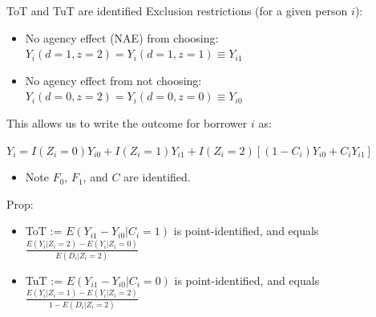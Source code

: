 \documentclass[9pt, aspectratio=169]{beamer}
\begin{document}
\begin{frame}{ToT and TuT are identified}
Exclusion restrictions (for a given person $i$):
\begin{itemize}
        \item No agency effect 
        (NAE) from choosing: $Y_i(d=1,z=2)=Y_i(d=1,z=1) \equiv Y_{i1}$
        \item  No agency effect from not choosing: $Y_i(d=0,z=2)=Y_i(d=0,z=0) \equiv Y_{i0}$
    \end{itemize}
\pause \vfill This allows us to write the outcome for borrower $i$ as:
\begin{center}
    $Y_i = I(Z_i =0) Y_{i0} + I(Z_i = 1)  Y_{i1}  + I(Z_i = 2) \left[(1 - C_i) Y_{i0} + C_i Y_{i1} \right]$
\end{center}
   
\begin{itemize}
    \item Note $F_0$, $F_1$, and $C$ are identified.
\end{itemize}
\vspace{.1in}

\pause Prop:
\begin{itemize}
    \item ToT := $E(Y_{i1} - Y_{i0} | C_i = 1)$ is point-identified, and equals $\frac{E(Y_i|Z_i=2) - E(Y_i|Z_i =0)}{E(D_i|Z_i=2)} $
     \item TuT := $E(Y_{i1} - Y_{i0} | C_i = 0)$ is point-identified, and equals $\frac{E(Y_i|Z_i=1) - E(Y_i|Z_i =2)}{1-E(D_i|Z_i=2)} $
\end{itemize}
\end{frame}
\end{document}
